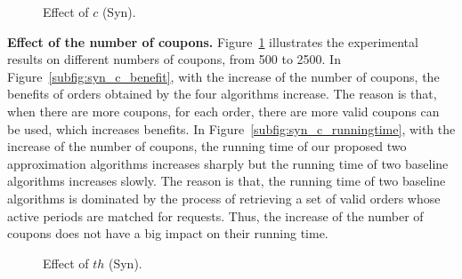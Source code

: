 \begin{figure}[t!]\centering
	\subfigcapskip=-5pt
	
	\vspace{-2ex}
	\addtocounter{subfigure}{-1}
	\figureCaptionMargin
		\vspace{1ex}
	\caption{\small Effect of $c$ (Syn).}\figureBelowMargin
	\label{fig:syn_c}
\end{figure}
\textbf{Effect of the number of coupons.} Figure~\ref{fig:syn_c} illustrates the experimental results on different numbers of coupons, from 500 to 2500. In Figure~\ref{subfig:syn_c_benefit}, with the increase of the number of coupons, the benefits of orders obtained by the four algorithms increase. The reason is that, when there are more coupons, for each order, there are more valid coupons can be used, which increases benefits. In Figure~\ref{subfig:syn_c_runningtime}, with the increase of the number of coupons, the running time of our proposed two approximation algorithms increases sharply but the running time of two baseline algorithms increases slowly. The reason is that, the running time of two baseline algorithms is dominated by the process of retrieving a set of valid orders whose active periods are matched for requests. Thus, the increase of the number of coupons does not have a big impact on their running time. 
\begin{figure}[t!]\centering
	\subfigcapskip=-5pt
		\vspace{1ex}
	\vspace{-2ex}
	\addtocounter{subfigure}{-1}
	\figureCaptionMargin
	\vspace{1ex}
	\caption{\small Effect of $th$ (Syn).}\figureBelowMargin
	\label{fig:syn_th}
\end{figure}

